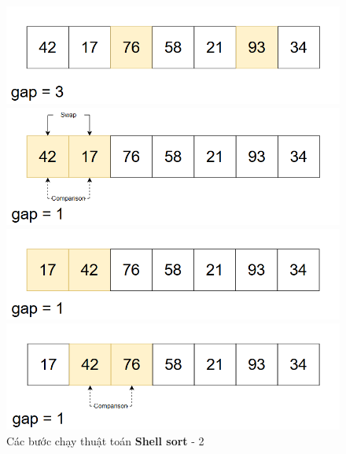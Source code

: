 \begin{figure}[H]
    \centering
    \includegraphics[width=1\linewidth]{img/shell_sort/5.png}
    \vspace{0.15cm}

    \includegraphics[width=1\linewidth]{img/shell_sort/6.png}
    \vspace{0.15cm}

    \includegraphics[width=1\linewidth]{img/shell_sort/7.png}
    \vspace{0.15cm}

    \includegraphics[width=1\linewidth]{img/shell_sort/8.png}
    \caption{Các bước chạy thuật toán \textbf{Shell sort} - 2}
\end{figure}

